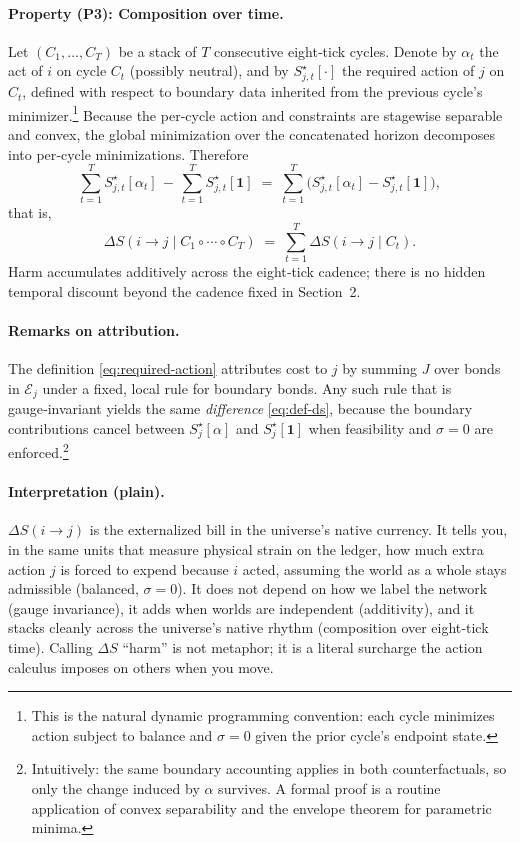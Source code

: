 \documentclass[11pt]{article}
\begin{document}
\paragraph{Property (P3): Composition over time.}
Let $(C_1,\dots,C_T)$ be a stack of $T$ consecutive eight‑tick cycles. Denote by $\alpha_t$ the act of $i$ on cycle $C_t$ (possibly neutral), and by $S_{j,t}^\star[\cdot]$ the required action of $j$ on $C_t$, defined with respect to boundary data inherited from the previous cycle’s minimizer.\footnote{This is the natural dynamic programming convention: each cycle minimizes action subject to balance and $\sigma=0$ given the prior cycle’s endpoint state.} Because the per‑cycle action and constraints are stagewise separable and convex, the global minimization over the concatenated horizon decomposes into per‑cycle minimizations. Therefore
\[
\sum_{t=1}^T S_{j,t}^\star[\alpha_t]
\,-\,
\sum_{t=1}^T S_{j,t}^\star[\mathbf 1]
\;=\;
\sum_{t=1}^T \big(S_{j,t}^\star[\alpha_t]-S_{j,t}^\star[\mathbf 1]\big),
\]
that is,
\begin{equation}
\Delta S(i\!\to\! j\mid C_1\circ\cdots\circ C_T)
\;=\;
\sum_{t=1}^T \Delta S(i\!\to\! j\mid C_t).
\label{eq:composition}
\end{equation}
Harm accumulates additively across the eight‑tick cadence; there is no hidden temporal discount beyond the cadence fixed in Section~2.

\paragraph{Remarks on attribution.}
The definition \eqref{eq:required-action} attributes cost to $j$ by summing $J$ over bonds in $\mathcal E_j$ under a fixed, local rule for boundary bonds. Any such rule that is gauge‑invariant yields the same \emph{difference} \eqref{eq:def-ds}, because the boundary contributions cancel between $S_j^\star[\alpha]$ and $S_j^\star[\mathbf 1]$ when feasibility and $\sigma=0$ are enforced.\footnote{Intuitively: the same boundary accounting applies in both counterfactuals, so only the change induced by $\alpha$ survives. A formal proof is a routine application of convex separability and the envelope theorem for parametric minima.}

\paragraph{Interpretation (plain).}
$\Delta S(i\!\to\! j)$ is the externalized bill in the universe’s native currency. It tells you, in the same units that measure physical strain on the ledger, how much extra action $j$ is forced to expend because $i$ acted, assuming the world as a whole stays admissible (balanced, $\sigma=0$). It does not depend on how we label the network (gauge invariance), it adds when worlds are independent (additivity), and it stacks cleanly across the universe’s native rhythm (composition over eight‑tick time). Calling $\Delta S$ “harm” is not metaphor; it is a literal surcharge the action calculus imposes on others when you move.
\end{document}
